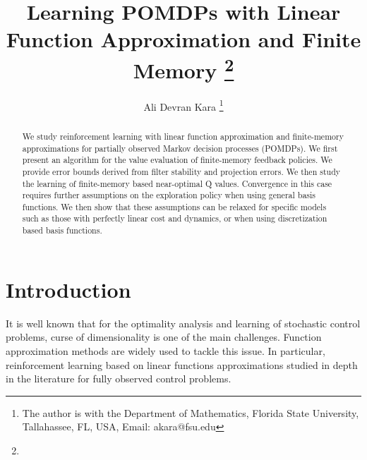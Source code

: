 \documentclass[letterpaper, 10 pt, conference]{ieeeconf}  %
\theoremstyle{definition}
\theoremstyle{remark}
\begin{document}
\sloppy
\title{ Learning POMDPs with Linear Function Approximation and Finite Memory
\thanks{}
}


\author{Ali Devran Kara
\thanks{The author is with the Department of Mathematics,
     Florida State University, Tallahassee, FL, USA,
     Email: akara@fsu.edu}
     }
\maketitle


\begin{abstract}
We study reinforcement learning with linear function approximation and finite-memory approximations for partially observed Markov decision processes (POMDPs). We first present an algorithm for the value evaluation of finite-memory feedback policies. We provide error bounds derived from filter stability and projection errors. We then study the learning of  finite-memory based near-optimal Q values. Convergence in this case requires further assumptions on the exploration policy when using general basis functions. We then show that these assumptions can be relaxed for specific models such as those with perfectly linear cost and dynamics, or when using discretization based basis functions.
\end{abstract}



\section{Introduction}
It is well known that for the optimality analysis and learning of stochastic control problems, curse of dimensionality is one of the main challenges. Function approximation methods are widely used to tackle this issue. In particular, reinforcement learning based on linear functions approximations studied in depth in the literature for fully observed control problems. 
\end{document}
